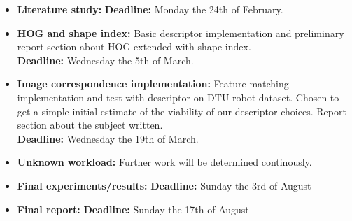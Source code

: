 \documentclass[11pt,a4paper]{article}
\begin{document}
\begin{itemize}
    \item{\textbf{Literature study:}
        \textbf{Deadline:} Monday the 24th of February.}
    \item{\textbf{HOG and shape index:} Basic descriptor implementation and
        preliminary report section about HOG extended with shape index. \\
        \textbf{Deadline:} Wednesday the 5th of March.}
    \item{\textbf{Image correspondence implementation:} Feature matching
        implementation and test with descriptor on DTU robot dataset. Chosen to
        get a simple initial estimate of the viability of our descriptor choices.
        Report section about the subject written. \\
        \textbf{Deadline:} Wednesday the 19th of March.}
    \item{\textbf{Unknown workload:} Further work will be determined
    continously.}
    \item{\textbf{Final experiments/results:}
        \textbf{Deadline:} Sunday the 3rd of August}
    \item{\textbf{Final report:}
        \textbf{Deadline:} Sunday the 17th of August}
\end{itemize}



\end{document}
